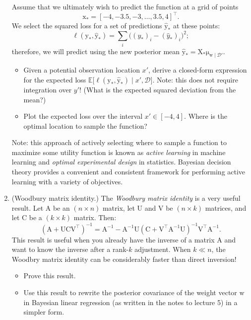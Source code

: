 \documentclass{article}
\newcommand{\given}{\mid}
\newcommand{\mc}[1]{\mathcal{#1}}
\newcommand{\data}{\mc{D}}
\newcommand{\mat}[1]{\bm{\mathrm{#1}}}
\renewcommand{\vec}[1]{\bm{\mathrm{#1}}}
\newcommand{\trans}{^\top}
\newcommand{\inv}{^{-1}}
\begin{document}
\begin{enumerate}
  Assume that we ultimately wish to predict the function at a grid of
  points
  \begin{equation*}
    \vec{x}_\ast = [-4, -3.5, -3, \dotsc, 3.5, 4]\trans.
  \end{equation*}
  We select the squared loss for a set of predictions
  $\hat{\vec{y}}_\ast$ at these points:
  \begin{equation*}
    \ell(\vec{y}_\ast, \hat{\vec{y}}_\ast)
    =
    \sum_i \bigl((y_\ast)_i - (\hat{y}_\ast)_i\bigr)^2;
  \end{equation*}
  therefore, we will predict using the new posterior mean
  $\hat{\vec{y}}_\ast = \mat{X}_\ast \vec{\mu}_{\vec{w}\given\data'}$.
  \begin{itemize}
  \item
    Given a potential observation location $x'$, derive a closed-form
    expression for the expected loss
    $\mathbb{E}\bigl[\ell(\vec{y}_\ast, \hat{\vec{y}}_\ast) \given x',
      \data \bigr]$.  Note: this does not require integration over
    $y'$!  (What is the expected squared deviation from the mean?)
  \item
    Plot the expected loss over the interval $x' \in [-4, 4]$.  Where
    is the optimal location to sample the function?
  \end{itemize}

  Note: this approach of actively selecting where to sample a function
  to maximize some utility function is known as \emph{active learning}
  in machine learning and \emph{optimal experimental design} in
  statistics.  Bayesian decision theory provides a convenient and
  consistent framework for performing active learning with a variety
  of objectives.

\item
  (Woodbury matrix identity.)
  The \emph{Woodbury matrix identity} is a very useful result.  Let
  $\mat{A}$ be an $(n \times n)$ matrix, let $\mat{U}$ and $\mat{V}$
  be $(n \times k)$ matrices, and let $\mat{C}$ be a $(k \times k)$
  matrix.  Then:
  \begin{equation*}
    (\mat{A} + \mat{U}\mat{C}\mat{V}\trans)\inv
    =
    \mat{A}\inv
    -
    \mat{A}\inv
    \mat{U}
    (\mat{C} + \mat{V}\trans \mat{A}\inv \mat{U})\inv
    \mat{V}\trans
    \mat{A}\inv.
  \end{equation*}
  This result is useful when you already have the inverse of a matrix
  $\mat{A}$ and want to know the inverse after a rank-$k$ adjustment.
  When $k \ll n$, the Woodbry matrix identity can be considerably
  faster than direct inversion!
  \begin{itemize}
  \item
    Prove this result.
  \item
    Use this result to rewrite the posterior covariance of the weight
    vector $\vec{w}$ in Bayesian linear regression (as written in the
    notes to lecture 5) in a simpler form.
  \end{itemize}


\end{enumerate}
\end{document}
